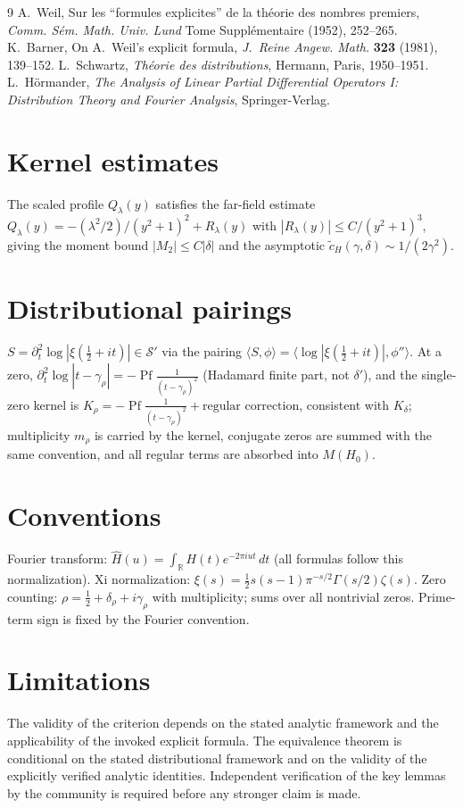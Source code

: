 \documentclass[11pt]{article}
\begin{document}
\begin{thebibliography}{9}
A.~Weil, Sur les ``formules explicites'' de la th\'eorie des nombres
premiers, \emph{Comm. S\'em. Math. Univ. Lund} Tome Suppl\'ementaire
(1952), 252--265.
K.~Barner, On A.~Weil's explicit formula,
\emph{J.~Reine Angew. Math.} \textbf{323} (1981), 139--152.
L.~Schwartz, \emph{Th\'eorie des distributions}, Hermann, Paris,
1950--1951.
L.~H\"ormander, \emph{The Analysis of Linear Partial Differential
Operators I: Distribution Theory and Fourier Analysis}, Springer-Verlag.
\end{thebibliography}

\appendix
\section{Kernel estimates}
The scaled profile $Q_\lambda(y)$ satisfies the far-field estimate
$Q_\lambda(y)=-(\lambda^2/2)/(y^2+1)^2+R_\lambda(y)$ with
$|R_\lambda(y)|\le C/(y^2+1)^3$, giving the moment bound $|M_2|\le C|\delta|$
and the asymptotic $\widetilde c_H(\gamma,\delta)\sim 1/(2\gamma^2)$.

\section{Distributional pairings}
$S=\partial_t^2\log|\xi(\tfrac12+it)|\in\mathcal S'$ via the pairing
$\langle S,\phi\rangle=\langle\log|\xi(\tfrac12+it)|,\phi''\rangle$.  At a
zero,
$\partial_t^2\log|t-\gamma_\rho|=-\operatorname{Pf}\frac1{(t-\gamma_\rho)^2}$
(Hadamard finite part, not $\delta'$), and the single-zero kernel is
$K_\rho=-\operatorname{Pf}\frac1{(t-\gamma_\rho)^2}+\text{regular
correction}$, consistent with $K_\delta$; multiplicity $m_\rho$ is carried
by the kernel, conjugate zeros are summed with the same convention, and
all regular terms are absorbed into $M(H_0)$.

\section{Conventions}
Fourier transform: $\widehat H(u)=\int_{\mathbb R}H(t)e^{-2\pi iut}\,dt$
(all formulas follow this normalization).  Xi normalization:
$\xi(s)=\tfrac12s(s-1)\pi^{-s/2}\Gamma(s/2)\zeta(s)$.  Zero counting:
$\rho=\tfrac12+\delta_\rho+i\gamma_\rho$ with multiplicity; sums over all
nontrivial zeros.  Prime-term sign is fixed by the Fourier convention.

\section*{Limitations}
The validity of the criterion depends on the stated analytic framework
and the applicability of the invoked explicit formula.  The equivalence theorem is conditional on the stated distributional
framework and on the validity of the explicitly verified analytic
identities.  Independent verification of the key lemmas by the community
is required before any stronger claim is made.
\end{document}
